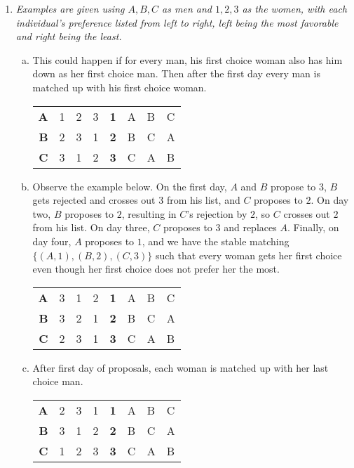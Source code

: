 \begin{enumerate}
    \item \textit{Examples are given using $A, B, C$ as men and $1, 2, 3$ as the women, with each individual's preference listed from left to right, left being the most favorable and right being the least.}
    \begin{enumerate}[(a)]
        \setlength{\parskip}{8pt}
        \item This could happen if for every man, his first choice woman also has him down as her first choice man. Then after the first day every man is matched up with his first choice woman.
        \begin{center}\begin{tabular}{rlll|rlll}
        \textbf{A} & 1 & 2 & 3 & \textbf{1} & A & B & C \\
        \textbf{B} & 2 & 3 & 1 & \textbf{2} & B & C & A \\
        \textbf{C} & 3 & 1 & 2 & \textbf{3} & C & A & B
        \end{tabular}\end{center}
        
        \item Observe the example below. On the first day, $A$ and $B$ propose to $3$, $B$ gets rejected and crosses out $3$ from his list, and $C$ proposes to $2$. On day two, $B$ proposes to $2$, resulting in $C$'s rejection by $2$, so $C$ crosses out $2$ from his list. On day three, $C$ proposes to $3$ and replaces $A$. Finally, on day four, $A$ proposes to $1$, and we have the stable matching $\{(A,1),(B,2),(C,3)\}$ such that every woman gets her first choice even though her first choice does not prefer her the most.
        \begin{center}\begin{tabular}{rlll|rlll}
        \textbf{A} & 3 & 1 & 2 & \textbf{1} & A & B & C \\
        \textbf{B} & 3 & 2 & 1 & \textbf{2} & B & C & A \\
        \textbf{C} & 2 & 3 & 1 & \textbf{3} & C & A & B
        \end{tabular}\end{center}
        
        \item After first day of proposals, each woman is matched up with her last choice man.
        \begin{center}\begin{tabular}{rlll|rlll}
        \textbf{A} & 2 & 3 & 1 & \textbf{1} & A & B & C \\
        \textbf{B} & 3 & 1 & 2 & \textbf{2} & B & C & A \\
        \textbf{C} & 1 & 2 & 3 & \textbf{3} & C & A & B
        \end{tabular}\end{center}
        

\end{enumerate}
\end{enumerate}
